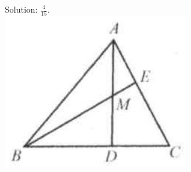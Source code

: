 \documentclass[10pt]{article}
\begin{document}
Solution: \(\frac{4}{15}\).\\
\includegraphics[max width=\textwidth, center]{2025_04_17_97bc1f7e44d93c271a88g-107}
\end{document}
